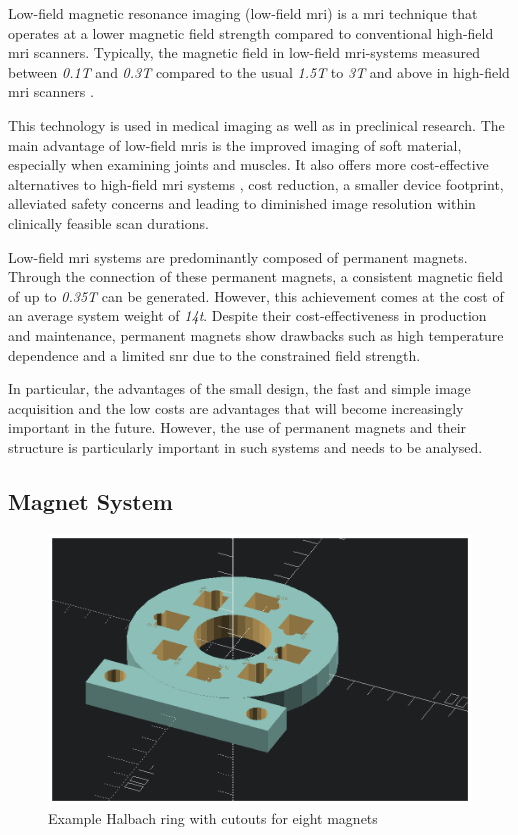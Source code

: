 Low-field magnetic resonance imaging (low-field \gls{mri}) is a
\gls{mri} technique that operates at a lower magnetic field strength
compared to conventional high-field \gls{mri} scanners. Typically, the
magnetic field in low-field \gls{mri}-systems measured between
\emph{0.1T} and \emph{0.3T} compared to the usual \emph{1.5T} to
\emph{3T} and above in high-field \gls{mri} scanners .

This technology is used in medical imaging as well as in preclinical
research. The main advantage of low-field \gls{mri}s is the improved
imaging of soft material, especially when examining joints and muscles.
It also offers more cost-effective alternatives to high-field \gls{mri}
systems , cost reduction, a smaller device footprint,
alleviated safety concerns and leading to diminished image resolution
within clinically feasible scan durations. 

Low-field \gls{mri} systems are predominantly composed of permanent
magnets. Through the connection of these permanent magnets, a consistent
magnetic field of up to \emph{0.35T} can be generated. However, this
achievement comes at the cost of an average system weight of \emph{14t}.
Despite their cost-effectiveness in production and maintenance,
permanent magnets show drawbacks such as high temperature dependence and
a limited \gls{snr} due to the constrained field strength.

In particular, the advantages of the small design, the fast and simple
image acquisition and the low costs are advantages that will become
increasingly important in the future. However, the use of permanent
magnets and their structure is particularly important in such systems
and needs to be analysed.

\hypertarget{magnet-system}{%
\subsection{Magnet System}\label{magnet-system}}

\begin{figure}
\centering
\includegraphics{./generated_images/border_Example_Halbach_ring_with_cutouts_for_eight_magnets.png}
\caption{Example Halbach ring with cutouts for eight magnets
\label{Example_Halbach_ring_with_cutouts_for_eight_magnets.png}}
\end{figure}

